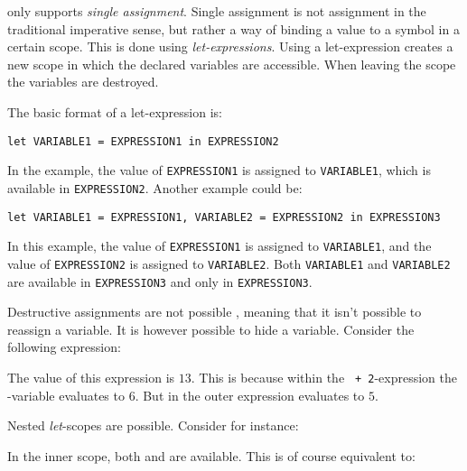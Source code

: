 \productname{} only supports \emph{single assignment}. Single assignment is not assignment
in the traditional imperative sense, but rather a way of binding a value to a symbol in a
certain scope. This is done using \emph{let-expressions}. Using a let-expression creates a
new scope in which the declared variables are accessible. When leaving the scope the
variables are destroyed.

The basic format of a let-expression is:

\texttt{let VARIABLE1 = EXPRESSION1 in EXPRESSION2}

In the example, the value of \texttt{EXPRESSION1} is assigned to \texttt{VARIABLE1}, which
is available in \texttt{EXPRESSION2}. Another example could be:

\texttt{let VARIABLE1 = EXPRESSION1, VARIABLE2 = EXPRESSION2 in EXPRESSION3}

In this example, the value of \texttt{EXPRESSION1} is assigned to \texttt{VARIABLE1}, and
the value of \texttt{EXPRESSION2} is assigned to \texttt{VARIABLE2}. Both \texttt{VARIABLE1}
and \texttt{VARIABLE2} are available in \texttt{EXPRESSION3} and only in \texttt{EXPRESSION3}.

Destructive assignments are not possible \productname{}, meaning that it isn't possible to 
reassign a variable. It is however possible to hide a variable.
Consider the following expression:


The value of this expression is $13$. This is because within the \texttt{ + 2}-expression
the -variable evaluates to $6$. But in the outer expression  evaluates to
$5$.

Nested \emph{let}-scopes are possible. Consider for instance:


In the inner scope, both  and  are available. This is of course equivalent
to:










%
%
%
%
%
%
%
%
